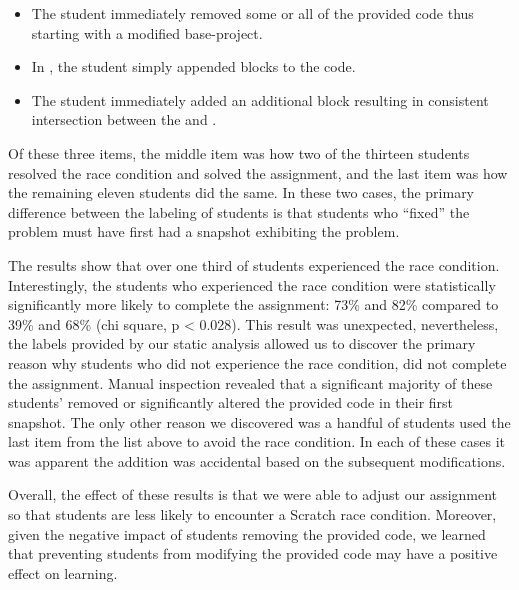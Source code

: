 \begin{itemize}
\item The student immediately removed some or all of the provided code thus
  starting with a modified base-project.
\item In \stwo{}, the student simply appended \glideto{} blocks to the code.
\item The student immediately added an additional \glideDIST{} block resulting
  in consistent intersection between the \net{} and \zebra{}.
\end{itemize}

Of these three items, the middle item was how two of the thirteen students
resolved the race condition and solved the assignment, and the last item was
how the remaining eleven students did the same. In these two cases, the primary
difference between the labeling of students is that students who ``fixed'' the
problem must have first had a snapshot exhibiting the problem.

The results show that over one third of students experienced the race
condition. Interestingly, the students who experienced the race condition were
statistically significantly more likely to complete the assignment: 73\% and
82\% compared to 39\% and 68\% (chi square, p < 0.028). This result was
unexpected, nevertheless, the labels provided by our static analysis allowed us
to discover the primary reason why students who did not experience the race
condition, did not complete the assignment. Manual inspection revealed that a
significant majority of these students' removed or significantly altered the
provided code in their first snapshot. The only other reason we discovered was
a handful of students used the last item from the list above to avoid the race
condition. In each of these cases it was apparent the addition was accidental
based on the subsequent modifications.

Overall, the effect of these results is that we were able to adjust our
assignment so that students are less likely to encounter a Scratch race
condition. Moreover, given the negative impact of students removing the
provided code, we learned that preventing students from modifying the provided
code may have a positive effect on learning.


